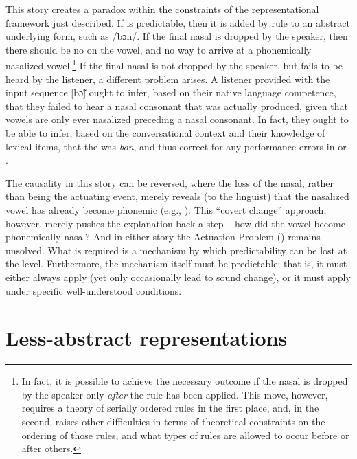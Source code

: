 This story creates a paradox within the constraints of the representational
framework just described. If  is predictable, then it
is added by rule to an abstract underlying form, such as {/bɔn/}.
If the final nasal is dropped by the speaker, then there should be
no  on the vowel, and no way to arrive at a phonemically
nasalized vowel.\footnote{In fact, it is possible to achieve the necessary outcome if the nasal
is dropped by the speaker only \emph{after} the  rule has
been applied. This move, however, requires a theory of serially ordered
rules in the first place, and, in the second, raises other difficulties
in terms of theoretical constraints on the ordering of those rules,
and what types of rules are allowed to occur before or after others.}
If the final nasal is not dropped by the speaker, but fails to be
heard by the listener, a different problem arises. A listener provided
with the input sequence {[bɔ̃]} ought to infer, based on
their native language competence, that they failed to hear a nasal
consonant that was actually produced, given that vowels are only ever
nasalized preceding a nasal consonant. In fact, they ought to be able
to infer, based on the conversational context and their knowledge
of lexical items, that the  was \textit{bon}, and thus correct
for any performance errors in  or .

The causality in this story can be reversed, where the loss of the
nasal, rather than being the actuating event, merely reveals (to the
linguist) that the nasalized vowel has already become phonemic (e.g.,
\citealt{Janda2003}). This ``covert change'' approach, however, merely
pushes the explanation back a step – how did the vowel become phonemically
nasal? And in either story the Actuation Problem (\citealt{Labov1968})
remains unsolved. What is required is a mechanism by which predictability
can be lost at the  level. Furthermore, the mechanism itself
must be predictable; that is, it must either always apply (yet only
occasionally lead to sound change), or it must apply under specific
well-understood conditions.

\section{\label{sec:Less-abstract-Representations}Less-abstract representations}\largerpage


